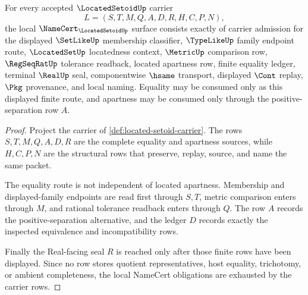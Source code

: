 \begin{theorem}
\label{thm:located-setoid-namecert-obligations}
For every accepted $\LocatedSetoidUp$ carrier
$$
L=(S,T,M,Q,A,D,R,H,C,P,N),
$$
the local $\NameCert_{\LocatedSetoidUp}$ surface consists exactly of carrier admission for the displayed $\SetLikeUp$ membership classifier, $\TypeLikeUp$ family endpoint route, $\LocatedSetUp$ locatedness context, $\MetricUp$ comparison row, $\RegSeqRatUp$ tolerance readback, located apartness row, finite equality ledger, terminal $\RealUp$ seal, componentwise $\hsame$ transport, displayed $\Cont$ replay, $\Pkg$ provenance, and local naming. Equality may be consumed only as this displayed finite route, and apartness may be consumed only through the positive-separation row $A$.
\end{theorem}
\begin{proof}
Project the carrier of \autoref{def:located-setoid-carrier}. The rows $S,T,M,Q,A,D,R$ are the complete equality and apartness sources, while $H,C,P,N$ are the structural rows that preserve, replay, source, and name the same packet.

The equality route is not independent of located apartness. Membership and displayed-family endpoints are read first through $S,T$, metric comparison enters through $M$, and rational tolerance readback enters through $Q$. The row $A$ records the positive-separation alternative, and the ledger $D$ records exactly the inspected equivalence and incompatibility rows.

Finally the Real-facing seal $R$ is reached only after those finite rows have been displayed. Since no row stores quotient representatives, host equality, trichotomy, or ambient completeness, the local NameCert obligations are exhausted by the carrier rows.
\end{proof}

